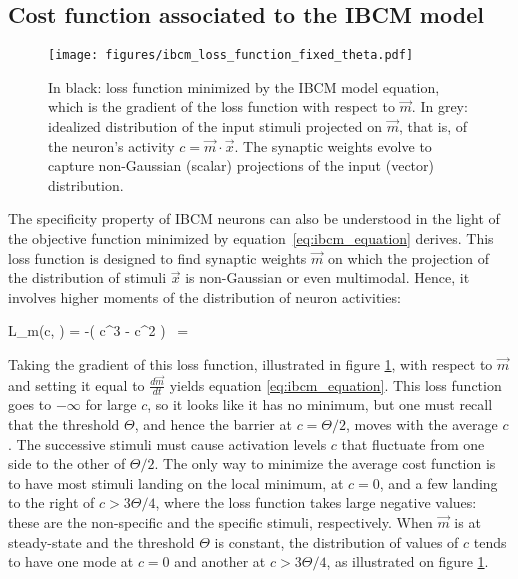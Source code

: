 \subsection{Cost function associated to the IBCM model}
\label{subsect:cost_function}

\begin{figure}
	\centering
	\texttt{[image: figures/ibcm\_loss\_function\_fixed\_theta.pdf]}
	\caption{In black: loss function minimized by the IBCM model equation, which is the gradient of the loss function with respect to $\vec{m}$. In grey: idealized distribution of the input stimuli projected on $\vec{m}$, that is, of the neuron's activity $c = \vec{m} \cdot \vec{x}$. The synaptic weights evolve to capture non-Gaussian (scalar) projections of the input (vector) distribution. }
	\label{fig:loss_function}
\end{figure}

The specificity property of IBCM  neurons can also be understood in the light of the objective function minimized by  equation~\eqref{eq:ibcm_equation} derives. This loss function is designed to find synaptic weights $\vec{m}$ on which the projection of the distribution of stimuli $\vec{x}$ is non-Gaussian or even multimodal. Hence, it involves higher moments of the distribution of neuron activities: 

\beq
	L_{m}(c, \Theta) = -\mu \left( c^3 -  \Theta c^2 \right)   \quad {} \, \Theta = 
	\label{eq:loss_function}
\eeq

Taking the gradient of this loss function, illustrated in figure \ref{fig:loss_function}, with respect to $\vec{m}$ and setting it equal to $\frac{d\vec{m}}{dt}$ yields equation \eqref{eq:ibcm_equation}. This loss function goes to $-\infty$ for large $c$, so it looks like it has no minimum, but one must recall that the threshold $\Theta$, and hence the barrier at $c=\Theta/2$, moves with the average $c$. The successive stimuli must cause activation levels $c$ that fluctuate from one side to the other of $\Theta/2$. The only way to minimize the average cost function is to have most stimuli landing on the local minimum, at $c=0$, and a few landing to the right of $c > 3\Theta/4$, where the loss function takes large negative values: these are the non-specific and the specific stimuli, respectively. When $\vec{m}$ is at steady-state and the threshold $\Theta$ is constant, the distribution of values of $c$ tends to have one mode at $c=0$ and another at $c > 3\Theta/4$, as illustrated on figure \ref{fig:loss_function}. 
